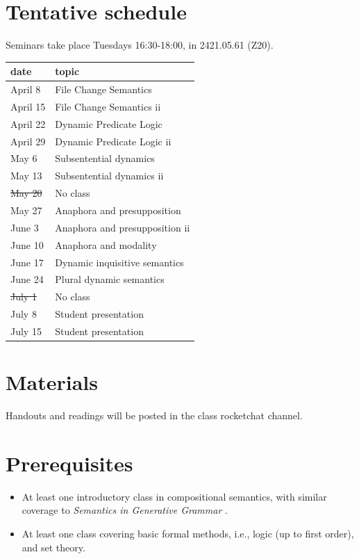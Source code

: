 \documentclass[a4paper]{scrartcl}
\begin{document}
\section{Tentative schedule}
\label{sec:org04e04f2}

Seminars take place Tuesdays 16:30-18:00, in 2421.05.61 (Z20).

\begin{center}
\begin{tabular}{ll}
date & topic\\
\hline
April 8 & File Change Semantics\\
April 15 & File Change Semantics ii\\
April 22 & Dynamic Predicate Logic\\
April 29 & Dynamic Predicate Logic ii\\
May 6 & Subsentential dynamics\\
May 13 & Subsentential dynamics ii\\
\sout{May 20} & No class\\
May 27 & Anaphora and presupposition\\
June 3 & Anaphora and presupposition ii\\
June 10 & Anaphora and modality\\
June 17 & Dynamic inquisitive semantics\\
June 24 & Plural dynamic semantics\\
\sout{July 1} & No class\\
July 8 & Student presentation\\
July 15 & Student presentation\\
\end{tabular}
\end{center}
\section{Materials}
\label{sec:orgbd37626}

Handouts and readings will be posted in the class rocketchat channel.
\section{Prerequisites}
\label{sec:org6a7d11a}

\begin{itemize}
\item At least one introductory class in compositional semantics, with
similar coverage to \emph{Semantics in Generative Grammar}
\autocite{HeimKratzer1998}.
\item At least one class covering basic formal methods, i.e., logic (up to first order), and set theory.
\end{itemize}
\end{document}

